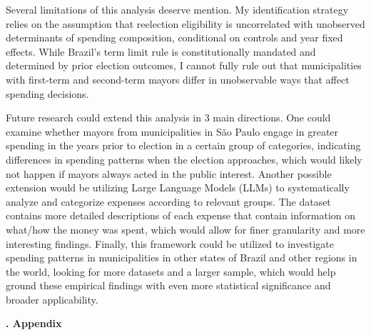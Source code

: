 \documentclass[12pt, a4paper]{article}
\newcounter{headercounter}
\newcommand{\header}[1]{\begin{center}{\large \textbf{\Roman{headercounter}. #1}} \end{center} \stepcounter{headercounter}}
\begin{document}
Several limitations of this analysis deserve mention. My identification strategy relies on the assumption that reelection eligibility is uncorrelated with unobserved determinants of spending composition, conditional on controls and year fixed effects. While Brazil's term limit rule is constitutionally mandated and determined by prior election outcomes, I cannot fully rule out that municipalities with first-term and second-term mayors differ in unobservable ways that affect spending decisions.

Future research could extend this analysis in 3 main directions. One could examine whether mayors from municipalities in São Paulo engage in greater spending in the years prior to election in a certain group of categories, indicating differences in spending patterns when the election approaches, which would likely not happen if mayors always acted in the public interest. Another possible extension would be utilizing Large Language Models (LLMs) to systematically analyze and categorize expenses according to relevant groups. The dataset contains more detailed descriptions of each expense that contain information on what/how the money was spent, which would allow for finer granularity and more interesting findings. Finally, this framework could be utilized to investigate spending patterns in municipalities in other states of Brazil and other regions in the world, looking for more datasets and a larger sample, which would help ground these empirical findings with even more statistical significance and broader applicability.




\newpage

\header{Appendix}
\end{document}
